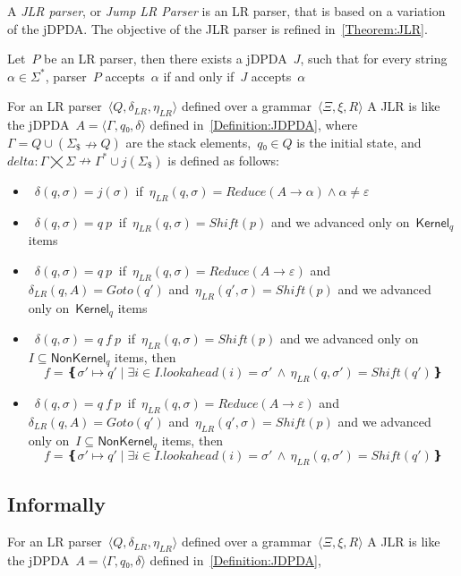A \emph{JLR parser}, or \emph{Jump LR Parser} is an LR parser, that
  is based on a variation of the jDPDA\@.
The objective of the JLR parser is refined in~\cref{Theorem:JLR}.

\begin{Theorem}
  \label{Theorem:JLR}
  Let~$P$ be an LR parser, then there exists a jDPDA~$J$,
  such that for every string~$α∈Σ^*$, parser~$P$ accepts~$α$
    if and only if~$J$ accepts~$α$
\end{Theorem}

For an LR parser~$⟨Q,δ_{LR}, η_{LR}⟩$ defined over a grammar~$⟨Ξ,ξ,R⟩$
A JLR is like the jDPDA~$A=⟨Γ,q₀,δ⟩$ defined in~\cref{Definition:JDPDA},
  where~$Γ= Q∪(Σ_\$↛Q)$ are the stack elements,~$q₀∈Q$
  is the initial state, and~$delta:Γ⨉Σ↛Γ^*∪j(Σ_\$)$ is defined as follows:
  \begin{itemize}
   \item~$δ(q,σ)= j(σ)$ if~$η_{LR}(q,σ)=Reduce(A→α)∧α≠ε$


   \item~$δ(q,σ)= q \: p~$ if~$η_{LR}(q,σ)=Shift(p)$ and we advanced only on~$\textsf{Kernel}_q$ items
   \item~$δ(q,σ)= q \: p~$ if~$η_{LR}(q,σ)=Reduce(A→ε)$
     and~$δ_{LR}(q,A)=Goto(q')$ and~$η_{LR}(q',σ)=Shift(p)$
     and we advanced only on~$\textsf{Kernel}_q$ items


   \item~$δ(q,σ)= q \: f \: p~$ if~$η_{LR}(q,σ)=Shift(p)$ and we advanced only on~$I⊆\textsf{NonKernel}_q$
     items, then
    \[
      f = ❴σ'↦q' \; | \;∃i∈I. lookahead(i)=σ' \,∧\, η_{LR}(q,σ')=Shift(q')❵
    \]

   \item~$δ(q,σ)= q \: f \: p~$ if~$η_{LR}(q,σ)=Reduce(A→ε)$
     and~$δ_{LR}(q,A)=Goto(q')$ and~$η_{LR}(q',σ)=Shift(p)$
     and we advanced only on~$I⊆\textsf{NonKernel}_q$
     items, then
     \[
      f = ❴σ'↦q' \; | \;∃i∈I. lookahead(i)=σ' \,∧\, η_{LR}(q,σ')=Shift(q')❵
     \]

  \end{itemize}
\subsection{Informally}

For an LR parser~$⟨Q,δ_{LR}, η_{LR}⟩$ defined over a grammar~$⟨Ξ,ξ,R⟩$
A JLR is like the jDPDA~$A=⟨Γ,q₀,δ⟩$ defined in~\cref{Definition:JDPDA},

